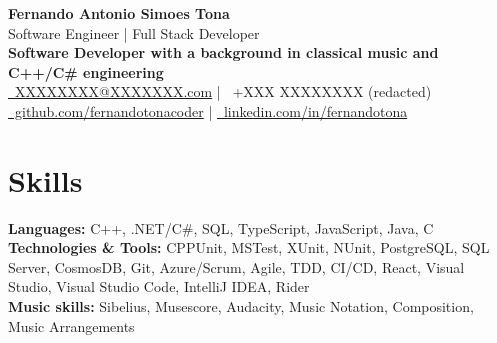\documentclass[a4paper,10pt]{article}
\begin{document}
\begin{center}
  {\LARGE \textbf{Fernando Antonio Simoes Tona}}\\[4pt]
  {\Large {Software Engineer | Full Stack Developer}}\\[2pt]
  \textbf{Software Developer with a background in classical music and C++/C\# engineering}\\

  \href{mailto:XXXXXXXX@XXXXXXX.com}{\faEnvelope\ XXXXXXXX@XXXXXXX.com} \quad | \quad
  \faMobile\ +XXX XXXXXXXX (redacted)\\[4pt]

  \href{https://github.com/fernandotonacoder}{\faGithub\ github.com/fernandotonacoder} \quad | \quad
  \href{https://www.linkedin.com/in/fernandotona/}{\faLinkedin\ linkedin.com/in/fernandotona}
\end{center}

\section{Skills}
\textbf{Languages:} C++, .NET/C\#, SQL, TypeScript, JavaScript, Java, C\\[3pt]
\textbf{Technologies \& Tools:} CPPUnit, MSTest, XUnit, NUnit, PostgreSQL, SQL Server, CosmosDB, Git, Azure/Scrum, Agile, TDD, CI/CD, React, Visual Studio, Visual Studio Code, IntelliJ IDEA, Rider\\[3pt]
\textbf{Music skills:} Sibelius, Musescore, Audacity, Music Notation, Composition, Music Arrangements
\end{document}
